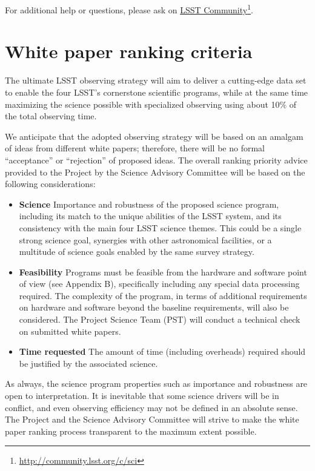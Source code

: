 \documentclass[DM,lsstdraft,toc,usenatbib]{lsstdoc}
\begin{document}
For additional help or questions, please ask on \href{https://community.lsst.org/c/sci}{LSST Community}\footnote{\url{http://community.lsst.org/c/sci}}. 


\section{White paper ranking criteria \label{sec:ranking}} 

The ultimate LSST observing strategy will aim to deliver a cutting-edge data set to enable
the four LSST's cornerstone scientific programs, while at the same time maximizing the 
science possible with specialized observing using about 10\% of the total observing time. 

We anticipate that the adopted observing strategy will be based on an amalgam of ideas from 
different white papers; therefore, there will be no formal ``acceptance'' or ``rejection'' of
proposed ideas. The overall ranking priority advice provided to the Project by the Science Advisory Committee 
will be based on the following considerations: 
\begin{itemize}
\item {\bf Science} Importance and robustness of the proposed science program, including 
           its match to the unique abilities of the LSST system, and its consistency with the 
           main four LSST science themes. This could be a single strong science goal, synergies with
           other astronomical facilities, or a multitude of science goals enabled by the same survey strategy. 
\item {\bf Feasibility} Programs must be feasible from the hardware and software point of view (see Appendix B),
         specifically including any special data processing required. The complexity of the program, in terms of additional
         requirements on hardware and software beyond the baseline requirements, will also be considered. 
         The Project Science Team (PST) will conduct a technical check on submitted white papers.
\item {\bf Time requested} The amount of time (including overheads) required should be justified by 
        the associated science. 
\end{itemize} 

As always, the science program properties such as importance and robustness are open
to interpretation. It is inevitable that some science drivers will be in conflict, and even
observing efficiency may not be defined in an absolute sense. The Project and the Science Advisory 
Committee will strive to make the white paper ranking process transparent to the maximum extent possible. 
\end{document}

